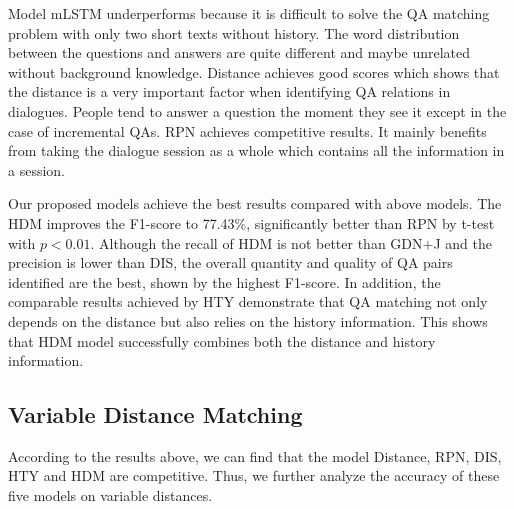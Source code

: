 Model mLSTM underperforms because it is difficult to solve the QA matching problem with 
only two short texts without history. The word distribution between the questions 
and answers are quite different and maybe unrelated without background knowledge. 
Distance achieves good scores which shows that the distance is a very important factor 
when identifying QA relations in dialogues. People tend to answer a question 
the moment they see it except in the case of incremental QAs. RPN achieves competitive 
results. It mainly benefits from taking the dialogue session as a whole which 
contains all the information in a session. 
 
Our proposed models achieve the best results compared with above models. 
The HDM improves the F1-score to 77.43\%, significantly better than RPN by t-test with
$p<0.01$. 
Although the recall of HDM is not better than GDN+J and the precision is 
lower than DIS, the overall quantity and quality of QA pairs identified 
are the best, shown by the highest F1-score. 
In addition, the comparable results achieved by HTY demonstrate that 
QA matching not only depends on 
the distance but also relies on the history information.
This shows that HDM model successfully combines both the distance and history 
information.

\subsection{Variable Distance Matching}

 According to the results above, we can find that the model Distance, RPN, DIS, HTY and HDM are competitive. Thus, we further analyze the accuracy of these five models on variable distances.

